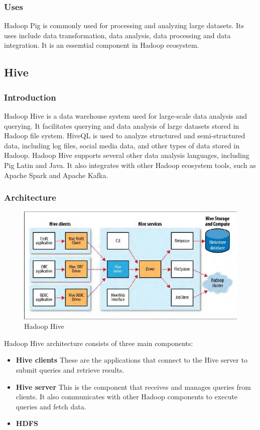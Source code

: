 \documentclass[12pt]{article}
\begin{document}
\subsubsection{Uses}
Hadoop Pig is commonly used for processing and analyzing large datasets. Its uses include data transformation, data analysis, data processing and data integration. It is an essemtial component in Hadoop ecosystem.
\subsection{Hive}
\subsubsection{Introduction}
Hadoop Hive is a data warehouse system used for large-scale data analysis and querying. It facilitates querying and data analysis of large datasets stored in Hadoop file system. HiveQL is used to analyze structured and semi-structured data, including log files, social media data, and other types of data stored in Hadoop. Hadoop Hive supports several other data analysis languages, including Pig Latin and Java. It also integrates with other Hadoop ecosystem tools, such as Apache Spark and Apache Kafka.
\subsubsection{Architecture}
\begin{figure}[h!]
    \centering
    \includegraphics[scale = 0.5]{images/Hive.png}
    \caption{Hadoop Hive}
\end{figure}
Hadoop Hive architecture consists of three main components:
\begin{itemize}
    \item {\bfseries Hive clients}
    These are the applications that connect to the Hive server to submit queries and retrieve results.
    \item {\bfseries Hive server}
    This is the component that receives and manages queries from clients. It also communicates with other Hadoop components to execute queries and fetch data.
    \item {\bfseries HDFS}
\end{itemize}
\end{document}
